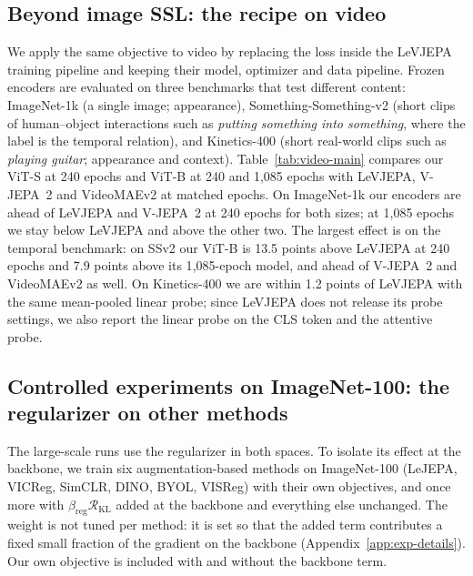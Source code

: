 \subsection{Beyond image SSL: the recipe on video}
\label{sec:exp-video}
We apply the same objective to video by replacing the loss inside the LeVJEPA training pipeline and keeping their model, optimizer and data pipeline. Frozen encoders are evaluated on three benchmarks that test different content: ImageNet-1k (a single image; appearance), Something-Something-v2 (short clips of human--object interactions such as \emph{putting something into something}, where the label is the temporal relation), and Kinetics-400 (short real-world clips such as \emph{playing guitar}; appearance and context). Table~\ref{tab:video-main} compares our ViT-S at 240 epochs and ViT-B at 240 and 1{,}085 epochs with LeVJEPA, V-JEPA~2 and VideoMAEv2 at matched epochs. On ImageNet-1k our encoders are ahead of LeVJEPA and V-JEPA~2 at 240 epochs for both sizes; at 1{,}085 epochs we stay below LeVJEPA and above the other two. The largest effect is on the temporal benchmark: on SSv2 our ViT-B is 13.5 points above LeVJEPA at 240 epochs and 7.9 points above its 1{,}085-epoch model, and ahead of V-JEPA~2 and VideoMAEv2 as well. On Kinetics-400 we are within 1.2 points of LeVJEPA with the same mean-pooled linear probe; since LeVJEPA does not release its probe settings, we also report the linear probe on the CLS token and the attentive probe.

\subsection{Controlled experiments on ImageNet-100: the regularizer on other methods}
\label{sec:exp-in100}
The large-scale runs use the regularizer in both spaces. To isolate its effect at the backbone, we train six augmentation-based methods on ImageNet-100 (LeJEPA, VICReg, SimCLR, DINO, BYOL, VISReg) with their own objectives, and once more with $\beta_{\mathrm{reg}}\mathcal{R}_{\mathrm{KL}}$ added at the backbone and everything else unchanged. The weight is not tuned per method: it is set so that the added term contributes a fixed small fraction of the gradient on the backbone (Appendix~\ref{app:exp-details}). Our own objective is included with and without the backbone term.

